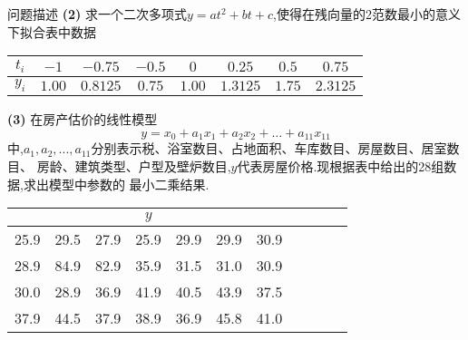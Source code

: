 \documentclass{article}
\begin{document}
\begin{section}{问题描述}
    \noindent\textbf{(2)} 求一个二次多项式$y=at^2+bt+c$,使得在残向量的2范数最小的意义下拟合表中数据
    \begin{table}[ht]
        \centering
        \begin{tabular}{c|ccccccc}
            \hline
            $t_i$ & $- 1$ & $- 0.75$ & $- 0.5$ & $0$ & $0.25$ & $0.5$ & $0.75$ \\
            \hline
            $y_i$ & $1.00$ & $0.8125$ & $0.75$ & $1.00$ & $1.3125$ & $1.75$ & $2.3125$ \\
            \hline
        \end{tabular}
    \end{table}
    
    \noindent\textbf{(3)} 在房产估价的线性模型
    $$y = x_0+a_1x_1 + a_2x_2+ \dots + a_{11}x_{11}$$
    中,$a_1,a_2,...,a_{11}$分别表示税、浴室数目、占地面积、车库数目、房屋数目、居室数目、
    房龄、建筑类型、户型及壁炉数目,$y$代表房屋价格.现根据表中给出的28组数据,求出模型中参数的
    最小二乘结果.
    \begin{table}[ht]
        \centering
        \begin{tabular}{ccccccccccc}
            \hline
            \multicolumn{7}{c}{$y$} \\
            \hline
            25.9 & 29.5 & 27.9 & 25.9 & 29.9 & 29.9 & 30.9 \\
            28.9 & 84.9 & 82.9 & 35.9 & 31.5 & 31.0 & 30.9 \\
            30.0 & 28.9 & 36.9 & 41.9 & 40.5 & 43.9 & 37.5 \\
            37.9 & 44.5 & 37.9 & 38.9 & 36.9 & 45.8 & 41.0 \\
            \hline
        \end{tabular}
    \end{table}
\end{section}
\end{document}
